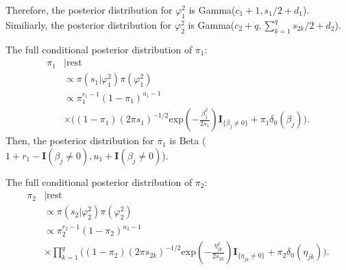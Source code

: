 \documentclass[12pt]{article}
\begin{document}
Therefore, the posterior distribution for $\varphi_1^2$ is Gamma($c_1+1, s_1/2+d_1$).
Similiarly, the posterior distribution for $\varphi_2^2$ is Gamma($c_2+q, \sum_{k=1}^{q} s_{2k}/2+d_2$).\par
The full conditional posterior distribution of $\pi_1$:
\begin{equation*}
\begin{aligned}
\pi_1&|\text{rest} \\
&\propto \pi(s_1|\varphi_1^2)\pi(\varphi_1^2)\\
&\propto \pi_{1}^{r_1-1}(1-\pi_1)^{u_1-1}\\
& \times \Big( (1-\pi_1)(2\pi s_1)^{-1/2} \text{exp}(-\frac{\beta_{j}^{2}}{2 s_1})\textbf{I}_{\{\beta_{j} \neq 0\}} + \pi_1 \delta_0(\beta_{j})  \Big).
\end{aligned}
\end{equation*}
Then, the posterior distribution for $\pi_1$ is Beta ($1+r_1- \textbf{I}{(\beta_j \neq 0)}, u_1+\textbf{I}{(\beta_j \neq 0)}$).\par
The full conditional posterior distribution of $\pi_2$:
\begin{equation*}
\begin{aligned}
\pi_2&|\text{rest} \\
&\propto \pi(s_2|\varphi_2^2)\pi(\varphi_2^2)\\
&\propto\pi_{2}^{r_2-1}(1-\pi_2)^{u_2-1}\\
& \times \prod_{k=1}^{q}\Big( (1-\pi_2)(2\pi s_{2k})^{-1/2} \text{exp}(-\frac{\eta_{jk}^{2}}{2 s_{2k}})\textbf{I}_{\{\eta_{jk} \neq 0\}} + \pi_2 \delta_0(\eta_{jk})  \Big).
\end{aligned}
\end{equation*}
\end{document}
